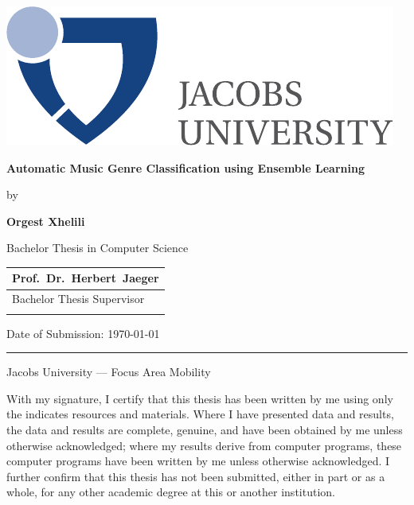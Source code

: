 \documentclass[a4paper,11pt,oneside]{article}
\newcommand{\myname}{Orgest Xhelili}
\newcommand{\mytitle}{Automatic Music Genre Classification using Ensemble Learning}
\newcommand{\mysupervisor}{Prof.~Dr.~Herbert~Jaeger}
\begin{document}

\thispagestyle{empty}

\begin{flushright}
\includegraphics[scale=0.7]{bsc-logo}
\end{flushright}
\vspace{20mm}
\begin{center}
\huge
\textbf{\mytitle}
\end{center}
\vspace*{4mm}
\begin{center}
 \Large by
\end{center}
\vspace*{4mm}
\begin{center}
\Large
\textbf{\myname}
\end{center}
\vspace*{20mm}
\begin{center}
\large
Bachelor Thesis in Computer Science
\end{center}
\vfill
\begin{flushright}
\large
\begin{tabular}{l}
\mysupervisor \\
\hline
Bachelor Thesis Supervisor \\
\\
\end{tabular}
\end{flushright}
\vspace*{8mm}
\begin{flushleft}
\large
Date of Submission: \today \\
\rule{\textwidth}{1pt}
\end{flushleft}
\begin{center}
\Large Jacobs University --- Focus Area Mobility
\end{center}

\newpage
\thispagestyle{empty}

With my signature, I certify that this thesis has been written by me
using only the indicates resources and materials. Where I have
presented data and results, the data and results are complete,
genuine, and have been obtained by me unless otherwise acknowledged;
where my results derive from computer programs, these computer
programs have been written by me unless otherwise acknowledged. I
further confirm that this thesis has not been submitted, either in
part or as a whole, for any other academic degree at this or another
institution.
\end{document}
